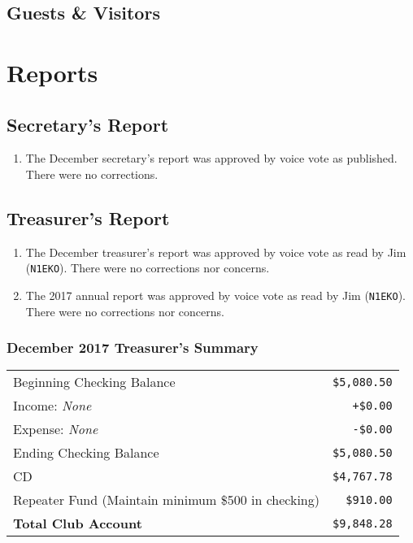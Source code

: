 \documentclass[10pt,letterpaper]{article}
\begin{document}
\subsection{Guests \& Visitors}


\section{Reports}

\subsection{Secretary's Report}
\begin{enumerate}
  \item The December secretary's report was approved by voice vote as published. There were no corrections.
\end{enumerate}

\newpage
\subsection{Treasurer's Report}
\begin{enumerate}
  \item The December treasurer's report was approved by voice vote as read by Jim (\texttt{N1EKO}). There were no corrections nor concerns.
  \item The 2017 annual report was approved by voice vote as read by Jim (\texttt{N1EKO}). There were no corrections nor concerns.
\end{enumerate}

\subsubsection{December 2017 Treasurer's Summary}
\noindent
\begin{tabular}{|l|r|}
  \hline
  Beginning Checking Balance & \texttt{\$5,080.50} \\
  Income: \emph{None} & \texttt{+\$0.00} \\
  Expense: \emph{None} & \texttt{-\$0.00} \\
  Ending Checking Balance & \texttt{\$5,080.50} \\
  \hline
  \hline
  CD & \texttt{\$4,767.78} \\
  \hline
  \hline
  Repeater Fund (Maintain minimum \$500 in checking) & \texttt{\$910.00} \\
  \hline
  \hline
  \textbf{Total Club Account} & \texttt{\$9,848.28} \\
  \hline
\end{tabular}
\end{document}
